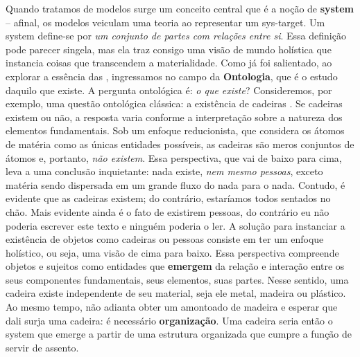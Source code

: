 \documentclass[./main.tex]{subfiles}
\begin{document}
\par Quando tratamos de modelos surge um conceito central que é a noção de \textbf{\gls{system}} – afinal, os modelos veiculam uma \gls{teoria} ao representar um \gls{sys-target}. Um \gls{system} define-se por \textit{um conjunto de partes com relações entre si}. Essa definição pode parecer singela, mas ela traz consigo uma visão de mundo holística que instancia coisas que transcendem a materialidade. Como já foi salientado, ao explorar a essência das , ingressamos no campo da \textbf{Ontologia}, que é o estudo daquilo que existe. A pergunta ontológica é: \textit{o que existe}? Consideremos, por exemplo, uma questão ontológica clássica: a existência de cadeiras \cite{bradley2019}. Se cadeiras existem ou não, a resposta varia conforme a interpretação sobre a natureza dos elementos fundamentais. Sob um enfoque reducionista, que considera os átomos de matéria como as únicas entidades possíveis, as cadeiras são meros conjuntos de átomos e, portanto, \textit{não existem}. Essa perspectiva, que vai de baixo para cima, leva a uma conclusão inquietante: nada existe, \textit{nem mesmo pessoas}, exceto matéria sendo dispersada em um grande fluxo do nada para o nada. Contudo, é evidente que as cadeiras existem; do contrário, estaríamos todos sentados no chão. Mais evidente ainda é o fato de existirem pessoas, do contrário eu não poderia escrever este texto e ninguém poderia o ler. A solução para instanciar a existência de objetos como cadeiras ou pessoas consiste em ter um enfoque holístico, ou seja, uma visão de cima para baixo. Essa perspectiva compreende objetos e sujeitos como entidades que \textbf{emergem} da relação e interação entre os seus componentes fundamentais, seus elementos, suas partes. Nesse sentido, uma cadeira existe independente de seu material, seja ele metal, madeira ou plástico. Ao mesmo tempo, não adianta obter um amontoado de madeira e esperar que dali surja uma cadeira: é necessário \textbf{organização}. Uma cadeira seria então o \gls{system} que emerge a partir de uma estrutura organizada que cumpre a função de servir de assento.
\end{document}
